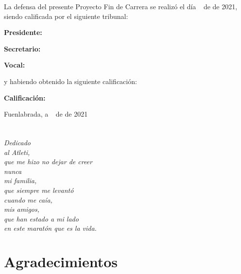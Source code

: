 \documentclass[a4paper, 12pt]{book}
\begin{document}
\vspace{1cm}
La defensa del presente Proyecto Fin de Carrera se realizó el día \qquad$\;\,$ de \qquad\qquad\qquad\qquad \newline de 2021, siendo calificada por el siguiente tribunal:


\vspace{0.5cm}
\textbf{Presidente:}

\vspace{1.2cm}
\textbf{Secretario:}

\vspace{1.2cm}
\textbf{Vocal:}


\vspace{1.2cm}
y habiendo obtenido la siguiente calificación:

\vspace{1cm}
\textbf{Calificación:}


\vspace{1cm}
\begin{flushright}
Fuenlabrada, a \qquad$\;\,$ de \qquad\qquad\qquad\qquad de 2021
\end{flushright}


\chapter*{}
\begin{flushright}
\textit{Dedicado\\
	al Atleti,\\que me hizo no dejar de creer\\nunca\\
	mi familia,\\que siempre me levantó\\cuando me caía,\\
	mis amigos,\\que han estado a mi lado\\en este maratón que es la vida.}
\end{flushright}


\chapter*{Agradecimientos}
\end{document}
